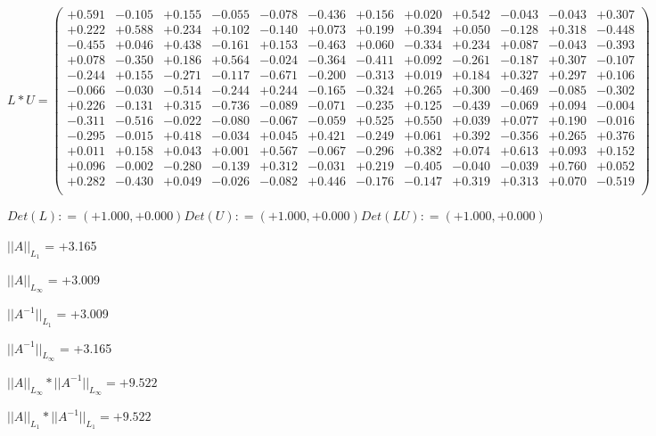 \documentclass[9pt]{article}
\theoremstyle{plain}
\theoremstyle{definition}
\theoremstyle{remark}
\numberwithin{equation}{section}
\begin{document}
$L * U  = \left(
\begin{array}{
cccccccccccc}
+0.591 & -0.105 & +0.155 & -0.055 & -0.078 & -0.436 & +0.156 & +0.020 & +0.542 & -0.043 & -0.043 & +0.307 \\
+0.222 & +0.588 & +0.234 & +0.102 & -0.140 & +0.073 & +0.199 & +0.394 & +0.050 & -0.128 & +0.318 & -0.448 \\
-0.455 & +0.046 & +0.438 & -0.161 & +0.153 & -0.463 & +0.060 & -0.334 & +0.234 & +0.087 & -0.043 & -0.393 \\
+0.078 & -0.350 & +0.186 & +0.564 & -0.024 & -0.364 & -0.411 & +0.092 & -0.261 & -0.187 & +0.307 & -0.107 \\
-0.244 & +0.155 & -0.271 & -0.117 & -0.671 & -0.200 & -0.313 & +0.019 & +0.184 & +0.327 & +0.297 & +0.106 \\
-0.066 & -0.030 & -0.514 & -0.244 & +0.244 & -0.165 & -0.324 & +0.265 & +0.300 & -0.469 & -0.085 & -0.302 \\
+0.226 & -0.131 & +0.315 & -0.736 & -0.089 & -0.071 & -0.235 & +0.125 & -0.439 & -0.069 & +0.094 & -0.004 \\
-0.311 & -0.516 & -0.022 & -0.080 & -0.067 & -0.059 & +0.525 & +0.550 & +0.039 & +0.077 & +0.190 & -0.016 \\
-0.295 & -0.015 & +0.418 & -0.034 & +0.045 & +0.421 & -0.249 & +0.061 & +0.392 & -0.356 & +0.265 & +0.376 \\
+0.011 & +0.158 & +0.043 & +0.001 & +0.567 & -0.067 & -0.296 & +0.382 & +0.074 & +0.613 & +0.093 & +0.152 \\
+0.096 & -0.002 & -0.280 & -0.139 & +0.312 & -0.031 & +0.219 & -0.405 & -0.040 & -0.039 & +0.760 & +0.052 \\
+0.282 & -0.430 & +0.049 & -0.026 & -0.082 & +0.446 & -0.176 & -0.147 & +0.319 & +0.313 & +0.070 & -0.519 \\
\end{array}
\right)$ \newline 

$Det(L) :    = (+1.000,+0.000)     Det(U) :    = (+1.000,+0.000)     Det(LU) :    = (+1.000,+0.000)$

$||A||_{L_1}$  = +3.165

$||A||_{L_{\infty}}$ = +3.009

$||A^{-1}||_{L_1}$  = +3.009

$||A^{-1}||_{L_{\infty}}$ = +3.165

$||A||_{L_{\infty}} * ||A^{-1}||_{L_{\infty}} = +9.522$

$||A||_{L_1} * ||A^{-1}||_{L_1} = +9.522$
\end{document}
